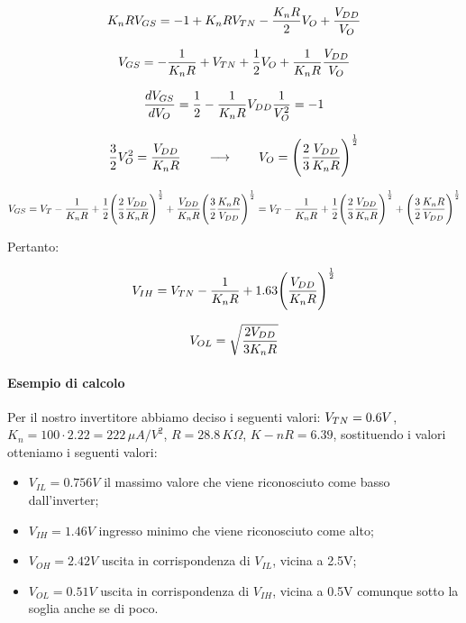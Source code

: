 \begin{equation*}
    K_nRV_{GS} = -1 + K_nRV_{TN} - \frac{K_nR}{2}V_O + \frac{V_{DD}}{V_O}
\end{equation*}


\begin{equation*}
    V_{GS} = -\frac{1}{K_nR} + V_{TN} + \frac{1}{2}V_O + \frac{1}{K_nR}\frac{V_{DD}}{V_O}
\end{equation*}

\begin{equation*}
    \frac{dV_{GS}}{dV_O} = \frac{1}{2} -  \frac{1}{K_nR}V_{DD} \frac{1}{V_O^2} = -1
\end{equation*}

\begin{equation*}
    \frac{3}{2}V_O^2 = \frac{V_{DD}}{K_nR} \qquad \longrightarrow \qquad V_O = \Bigg(\frac{2}{3}\frac{V_{DD}}{K_nR}\Bigg)^{\frac{1}{2}}
\end{equation*}

\begin{equation*}
    V_{GS} = V_{T} - \frac{1}{K_nR} + \frac{1}{2}\Bigg(\frac{2}{3}\frac{V_{DD}}{K_nR}\Bigg)^{\frac{1}{2}} + \frac{V_{DD}}{K_nR}\Bigg(\frac{3}{2}\frac{K_nR}{V_{DD}}\Bigg)^{\frac{1}{2}} = V_{T} - \frac{1}{K_nR} + \frac{1}{2}\Bigg(\frac{2}{3}\frac{V_{DD}}{K_nR}\Bigg)^{\frac{1}{2}} + \Bigg(\frac{3}{2}\frac{K_nR}{V_{DD}}\Bigg)^{\frac{1}{2}}
\end{equation*}

Pertanto:

\begin{equation*}
   V_{IH} = V_{TN} - \frac{1}{K_nR} + 1.63\Bigg(\frac{V_{DD}}{K_nR}\Bigg)^{\frac{1}{2}}
\end{equation*}

\begin{equation*}
    V_{OL} = \sqrt{\frac{2V_{DD}}{3K_nR}}
\end{equation*}

\paragraph{Esempio di calcolo}

Per il nostro invertitore abbiamo deciso i seguenti valori: $V_{TN} = 0.6V$, $K_n = 100\cdot2.22 = 222\,\mu A/V^2$, $R = 28.8\,K\Omega$,  $K-nR = 6.39$, sostituendo i valori otteniamo i seguenti valori:

\begin{itemize}
    \item $V_{IL} = 0.756 V$ il massimo valore che viene riconosciuto come basso dall'inverter;
    \item $V_{IH} = 1.46 V$ ingresso minimo che viene riconosciuto come alto;
    \item $V_{OH} = 2.42 V$ uscita in corrispondenza di $V_{IL}$, vicina a 2.5V;
    \item $V_{OL} = 0.51 V$ uscita in corrispondenza di $V_{IH}$, vicina a 0.5V comunque sotto la soglia anche se di poco.
\end{itemize}

